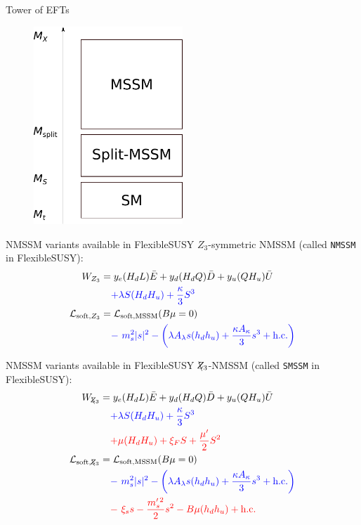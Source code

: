 \documentclass[hyperref={pdfpagelabels=false},ngerman]{beamer}
\newcommand{\Lagr}{\mathcal{L}}
\newcommand{\Zv}{\ensuremath{\backslash\mkern-11.0mu{Z_3}}}
\begin{document}
\begin{frame}{Tower of EFTs}
  \begin{figure}
    \centering
    \includegraphics[width=0.5\textwidth]{images/mssm-splitmssm-tower.pdf}
  \end{figure}
\end{frame}

\begin{frame}{NMSSM variants available in FlexibleSUSY}
  $Z_3$-symmetric NMSSM (called \texttt{NMSSM} in FlexibleSUSY):
  \begin{align*} 
    W_{Z_3} &= y_e (H_d L) \bar{E}
      + y_d (H_d Q) \bar{D}
      + y_u (Q H_u) \bar{U}\\
      &\phantom{={}}
      \textcolor{blue}{+ \lambda S (H_d H_u) + \frac{\kappa}{3}S^{3}} \\
    \Lagr_{\text{soft},Z_3} &= \Lagr_\text{soft,MSSM}(B\mu=0)\\
    &\phantom{={}}
    \textcolor{blue}{ -\ m_s^2|s|^2 
      -\left(\lambda A_\lambda s (h_d h_u)
        + \frac{\kappa A_\kappa}{3} s^3 + \text{h.c.}\right)}
  \end{align*}
\end{frame}

\begin{frame}{NMSSM variants available in FlexibleSUSY}
  $\Zv$-NMSSM (called \texttt{SMSSM} in FlexibleSUSY):
  \begin{align*} 
    W_{\Zv} &= y_e (H_d L) \bar{E}
      + y_d (H_d Q) \bar{D}
      + y_u (Q H_u) \bar{U}\\
      &\phantom{={}}
      \textcolor{blue}{+ \lambda S (H_d H_u) + \frac{\kappa}{3}S^{3}} \\
      &\phantom{={}}
      \textcolor{red}{+ \mu(H_d H_u) + \xi_FS 
      + \frac{\mu^\prime}{2} S^{2}}\\
    \Lagr_{\text{soft},\Zv} &= \Lagr_\text{soft,MSSM}(B\mu=0)\\
    &\phantom{={}}
    \textcolor{blue}{ -\ m_s^2|s|^2 
      -\left(\lambda A_\lambda s (h_d h_u)
        + \frac{\kappa A_\kappa}{3} s^3 + \text{h.c.}\right)}\\
    &\phantom{={}}
    \textcolor{red}{ -\ \xi_s s - \frac{m_s^{\prime \, 2}}{2} s^2
    - B\mu (h_d h_u) + \text{h.c.}}
  \end{align*}
\end{frame}
\end{document}
